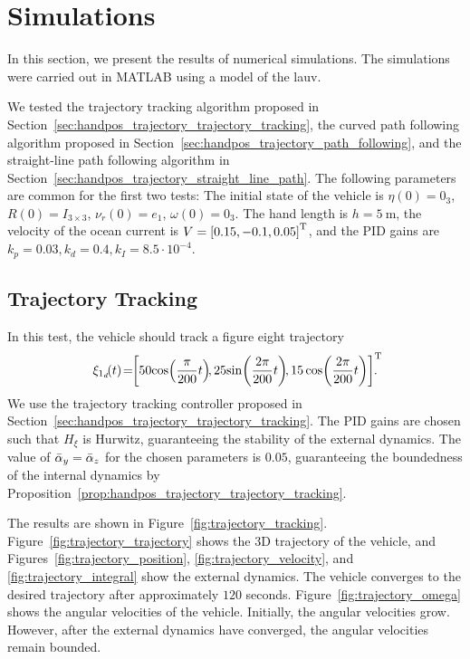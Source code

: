 \section{Simulations}
\label{sec:handpos_trajectory_simulations}





In this section, we present the results of numerical simulations.
The simulations were carried out in MATLAB using a model of the \acrfull{lauv}.

We tested the trajectory tracking algorithm proposed in Section~\ref{sec:handpos_trajectory_trajectory_tracking}, the curved path following algorithm proposed in Section~\ref{sec:handpos_trajectory_path_following}, and the straight-line path following algorithm in Section~\ref{sec:handpos_trajectory_straight_line_path}.
The following parameters are common for the first two tests:
The initial state of the vehicle is $\eta(0) = 0_3$, $R(0) = I_{3 \times 3}$, $\nu_r(0) = e_1$, $\omega(0) = 0_3$.
The hand length is $h = \SI{5}{\meter}$, the velocity of the ocean current is $V = \left[0.15, -0.1, 0.05\right]^{\mathrm{T}}$, and the PID gains are $k_p = 0.03, k_d = 0.4, k_I = 8.5 \cdot 10^{-4}$.

\subsection{Trajectory Tracking}

In this test, the vehicle should track a figure eight trajectory
\begin{equation}
    \xi_{1_d}\!(t) \!=\!\! \inlinevector{50\!\cos\!\left(\frac{\pi}{200}t\right)\!\!, 25\!\sin\!\left(\frac{2\pi}{200}t\right)\!\!, 15\cos\!\left(\frac{2\pi}{200}t\right)}\!\!\!\!\!.
\end{equation}
We use the trajectory tracking controller proposed in Section~\ref{sec:handpos_trajectory_trajectory_tracking}.
The PID gains are chosen such that $H_{\xi}$ is Hurwitz, guaranteeing the stability of the external dynamics.
The value of $\Bar{\alpha}_y = \Bar{\alpha}_z$ for the chosen parameters is $0.05$, guaranteeing the boundedness of the internal dynamics by Proposition~\ref{prop:handpos_trajectory_trajectory_tracking}.

The results are shown in Figure~\ref{fig:trajectory_tracking}.
Figure~\ref{fig:trajectory_trajectory} shows the 3D trajectory of the vehicle, and Figures~\ref{fig:trajectory_position}, \ref{fig:trajectory_velocity}, and \ref{fig:trajectory_integral} show the external dynamics.
The vehicle converges to the desired trajectory after approximately $120$ seconds.
Figure~\ref{fig:trajectory_omega} shows the angular velocities of the vehicle.
Initially, the angular velocities grow.
However, after the external dynamics have converged, the angular velocities remain bounded.

